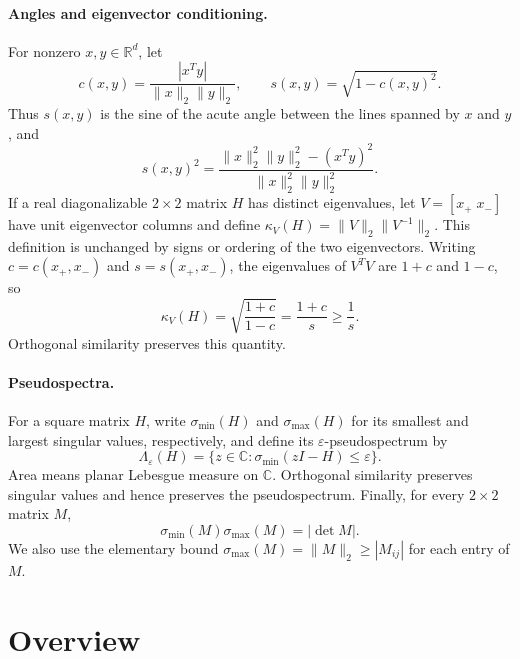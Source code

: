 \documentclass[11pt]{article}
\begin{document}
\paragraph{Angles and eigenvector conditioning.}
For nonzero $x,y\in\mathbb R^d$, let
\[
  c(x,y)=\frac{|x^Ty|}{\lVert x\rVert_2\lVert y\rVert_2},
  \qquad
  s(x,y)=\sqrt{1-c(x,y)^2}.
\]
Thus $s(x,y)$ is the sine of the acute angle between the lines spanned by
$x$ and $y$, and
\begin{equation}
  s(x,y)^2
  =\frac{\lVert x\rVert_2^2\lVert y\rVert_2^2-(x^Ty)^2}
  {\lVert x\rVert_2^2\lVert y\rVert_2^2}.
  \label{eq:gram-angle}
\end{equation}
If a real diagonalizable $2\times2$ matrix $H$ has distinct eigenvalues, let
$V=[x_+\;x_-]$ have unit eigenvector columns and define
$\kappa_V(H)=\lVert V\rVert_2\lVert V^{-1}\rVert_2$.  This definition is
unchanged by signs or ordering of the two eigenvectors.  Writing
$c=c(x_+,x_-)$ and $s=s(x_+,x_-)$, the eigenvalues of $V^TV$ are $1+c$ and
$1-c$, so
\begin{equation}
  \kappa_V(H)
  =\sqrt{\frac{1+c}{1-c}}
  =\frac{1+c}{s}
  \geq\frac1s.
  \label{eq:angle-conditioning}
\end{equation}
Orthogonal similarity preserves this quantity.

\paragraph{Pseudospectra.}
For a square matrix $H$, write $\sigma_{\min}(H)$ and $\sigma_{\max}(H)$ for
its smallest and largest singular values, respectively, and define its
$\varepsilon$-pseudospectrum by
\[
  \Lambda_\varepsilon(H)
  =\{z\in\mathbb C:\sigma_{\min}(zI-H)\leq\varepsilon\}.
\]
Area means planar Lebesgue measure on $\mathbb C$.  Orthogonal similarity
preserves singular values and hence preserves the pseudospectrum.  Finally,
for every $2\times2$ matrix $M$,
\begin{equation}
  \sigma_{\min}(M)\sigma_{\max}(M)=|\det M|.
  \label{eq:two-by-two-singular-values}
\end{equation}
We also use the elementary bound $\sigma_{\max}(M)=\lVert M\rVert_2\geq
|M_{ij}|$ for each entry of $M$.

\section{Overview}
\label{sec:overview}
\end{document}
